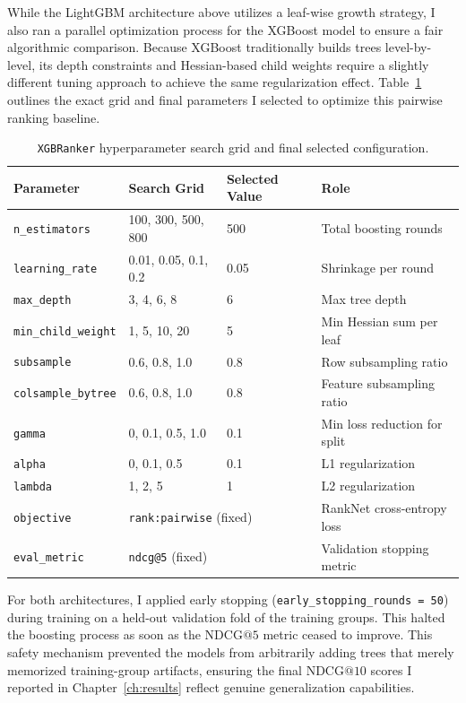 While the LightGBM architecture above utilizes a leaf-wise growth strategy, I also ran a parallel optimization process for the XGBoost model to ensure a fair algorithmic comparison. Because XGBoost traditionally builds trees level-by-level, its depth constraints and Hessian-based child weights require a slightly different tuning approach to achieve the same regularization effect. Table~\ref{tab:xgb_hyperparams} outlines the exact grid and final parameters I selected to optimize this pairwise ranking baseline.

\begin{table}[htbp]
\centering
\caption{\texttt{XGBRanker} hyperparameter search grid and final selected configuration.}
\label{tab:xgb_hyperparams}
\small
\begin{tabular}{@{}llll@{}}
\toprule
\textbf{Parameter} & \textbf{Search Grid} & \textbf{Selected Value} & \textbf{Role} \\
\midrule
\texttt{n\_estimators}      & 100, 300, 500, 800    & 500   & Total boosting rounds \\
\texttt{learning\_rate}     & 0.01, 0.05, 0.1, 0.2 & 0.05  & Shrinkage per round \\
\texttt{max\_depth}         & 3, 4, 6, 8            & 6     & Max tree depth \\
\texttt{min\_child\_weight} & 1, 5, 10, 20          & 5     & Min Hessian sum per leaf \\
\texttt{subsample}          & 0.6, 0.8, 1.0         & 0.8   & Row subsampling ratio \\
\texttt{colsample\_bytree}  & 0.6, 0.8, 1.0         & 0.8   & Feature subsampling ratio \\
\texttt{gamma}              & 0, 0.1, 0.5, 1.0      & 0.1   & Min loss reduction for split \\
\texttt{alpha}              & 0, 0.1, 0.5           & 0.1   & L1 regularization \\
\texttt{lambda}             & 1, 2, 5               & 1     & L2 regularization \\
\texttt{objective}          & \multicolumn{2}{l}{\texttt{rank:pairwise} (fixed)} & RankNet cross-entropy loss \\
\texttt{eval\_metric}       & \multicolumn{2}{l}{\texttt{ndcg@5} (fixed)}        & Validation stopping metric \\
\bottomrule
\end{tabular}
\end{table}

For both architectures, I applied early stopping (\texttt{early\_stopping\_rounds = 50}) during training on a held-out validation fold of the training groups. This halted the boosting process as soon as the $\text{NDCG}@5$ metric ceased to improve. This safety mechanism prevented the models from arbitrarily adding trees that merely memorized training-group artifacts, ensuring the final $\text{NDCG}@10$ scores I reported in Chapter~\ref{ch:results} reflect genuine generalization capabilities.

